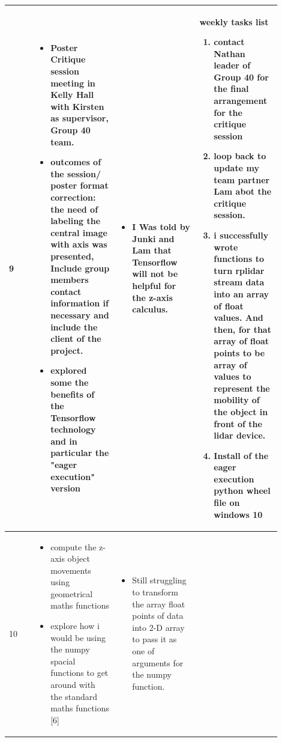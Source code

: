 \documentclass[10pt,draftclsnofoot,onecolumn,journal,compsoc]{IEEEtran}
\begin{document}
\begin{singlespace}
\begin{longtable}{|l|p{0.3\linewidth}|p{0.3\linewidth}|p{0.3\linewidth}|}
			\\\hline

		9	&
		\begin{itemize}
		\item Poster Critique session meeting in Kelly Hall with Kirsten as supervisor,  Group 40 team.
		\item outcomes of the session/ poster format correction: the need of labeling the central image with axis was presented, Include group members contact  information if necessary and include the client of the project.
		\item explored some the benefits of the Tensorflow technology and in particular the "eager execution" version   
		\end{itemize}

			&
\begin{itemize}
\item  I Was told by Junki and Lam that Tensorflow will not be helpful for the z-axis calculus.
\end{itemize}
			&
			
			\textbf{ weekly tasks list}
\begin{enumerate}
\item contact Nathan leader of Group 40 for the final arrangement for the critique session
\item loop back to update my team partner Lam abot the critique session.
\item i successfully wrote functions to turn rplidar stream data into an array of float values. And then, for that array of float points to be array of values to represent the mobility of the object in front of the lidar device.
\item Install of the eager execution python wheel file on windows 10 
\end{enumerate}
			\\\hline

		10	&
\begin{itemize}
\item compute the z-axis object movements using geometrical maths functions
\item explore how i would be using the numpy spacial functions to get around with the standard maths functions [6]
\end{itemize}
			&
\begin{itemize}
\item Still struggling to transform the array float points of data into 2-D array to pass it as one of arguments for the  numpy function.  
\end{itemize}			
			

\end{longtable}
\end{singlespace}
\end{document}
